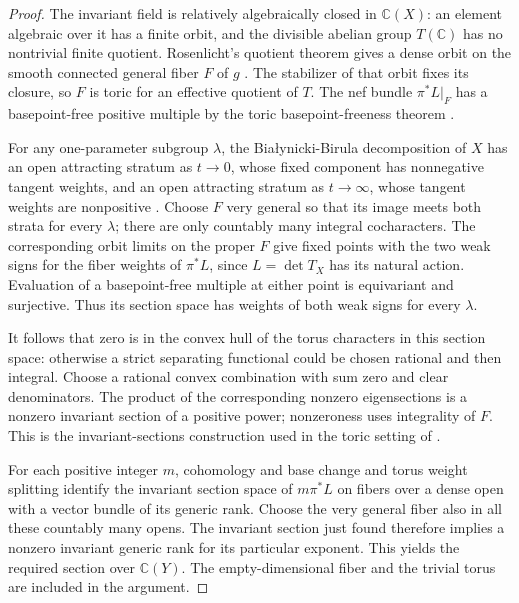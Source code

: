 \begin{proof}
The invariant field is relatively algebraically closed in $\mathbb C(X)$:
an element algebraic over it has a finite orbit, and the divisible abelian
group $T(\mathbb C)$ has no nontrivial finite quotient. Rosenlicht's
quotient theorem gives a dense orbit on the smooth connected general
fiber $F$ of $g$ \cite{Rosenlicht1956}. The stabilizer of that orbit fixes
its closure, so $F$ is toric for an effective quotient of $T$. The nef
bundle $\pi^*L|_F$ has a basepoint-free positive multiple by the toric
basepoint-freeness theorem \cite[Theorem~6.3.12]{CLS2011}.

For any one-parameter subgroup $\lambda$, the Bia\l{}ynicki-Birula
decomposition of $X$ has an open attracting stratum as $t\to0$, whose
fixed component has nonnegative tangent weights, and an open attracting
stratum as $t\to\infty$, whose tangent weights are nonpositive
\cite{BB1973}. Choose $F$ very general so that its image meets both
strata for every $\lambda$; there are only countably many integral
cocharacters. The corresponding orbit limits on the proper $F$ give
fixed points with the two weak signs for the fiber weights of $\pi^*L$,
since $L=\det T_X$ has its natural action. Evaluation of a basepoint-free
multiple at either point is equivariant and surjective. Thus its section
space has weights of both weak signs for every $\lambda$.

It follows that zero is in the convex hull of the torus characters in
this section space: otherwise a strict separating functional could be
chosen rational and then integral. Choose a rational convex combination
with sum zero and clear denominators. The product of the corresponding
nonzero eigensections is a nonzero invariant section of a positive power;
nonzeroness uses integrality of $F$. This is the invariant-sections
construction used in the toric setting of \cite[Section~3]{Muller2025}.

For each positive integer $m$, cohomology and base change and torus
weight splitting identify the invariant section space of $m\pi^*L$ on
fibers over a dense open with a vector bundle of its generic rank.
Choose the very general fiber also in all these countably many opens.
The invariant section just found therefore implies a nonzero invariant
generic rank for its particular exponent. This yields the required
section over $\mathbb C(Y)$. The empty-dimensional fiber and the trivial
torus are included in the argument.
\end{proof}

